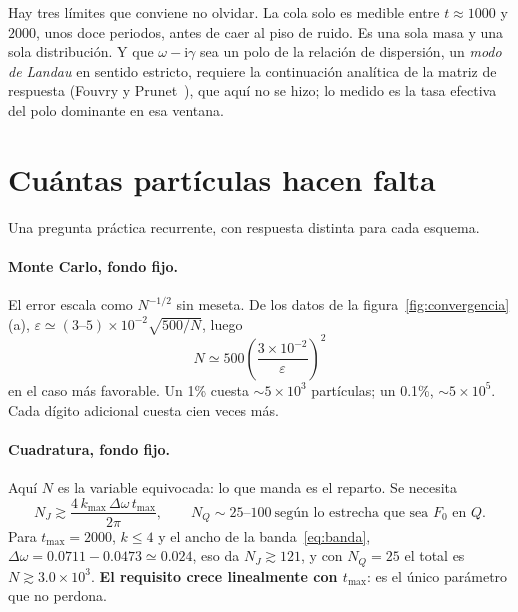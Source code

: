\documentclass[11pt,a4paper]{article}
\newcommand{\ii}{\mathrm{i}}
\newcommand{\Qr}{Q}
\theoremstyle{definition}
\begin{document}
Hay tres límites que conviene no olvidar. La cola solo es medible entre $t\approx1000$ y
$2000$, unos doce periodos, antes de caer al piso de ruido. Es una sola masa y una sola
distribución. Y que $\omega-\ii\gamma$ sea un polo de la relación de dispersión, un
\emph{modo de Landau} en sentido estricto, requiere la continuación analítica de la
matriz de respuesta (Fouvry y Prunet~\cite{fouvry2022}), que aquí no se hizo; lo medido
es la tasa efectiva del polo dominante en esa ventana.

\section{Cuántas partículas hacen falta}
\label{sec:cuantas}

Una pregunta práctica recurrente, con respuesta distinta para cada esquema.

\paragraph{Monte Carlo, fondo fijo.} El error escala como $N^{-1/2}$ sin meseta.
De los datos de la figura~\ref{fig:convergencia}(a),
$\varepsilon \simeq (3\text{--}5)\times10^{-2}\sqrt{500/N}$, luego
\begin{equation}
  N \simeq 500\left(\frac{3\times10^{-2}}{\varepsilon}\right)^{2}
\end{equation}
en el caso más favorable. Un 1\% cuesta $\sim5\times10^3$ partículas; un 0.1\%,
$\sim5\times10^5$. Cada dígito adicional cuesta cien veces más.

\paragraph{Cuadratura, fondo fijo.} Aquí $N$ es la variable equivocada: lo que manda
es el reparto. Se necesita
\begin{equation}
  N_J \gtrsim \frac{4\,k_{\max}\,\Delta\omega\,t_{\max}}{2\pi},
  \qquad
  N_Q \sim 25\text{--}100 \ \text{según lo estrecha que sea } F_0 \text{ en } \Qr .
\end{equation}
Para $t_{\max}=2000$, $k\le4$ y el ancho de la banda~\eqref{eq:banda},
$\Delta\omega=0.0711-0.0473\simeq0.024$, eso da $N_J\gtrsim121$, y con $N_Q=25$ el
total es $N\gtrsim3.0\times10^3$. \textbf{El requisito crece
linealmente con $t_{\max}$}: es el único parámetro que no perdona.
\end{document}
